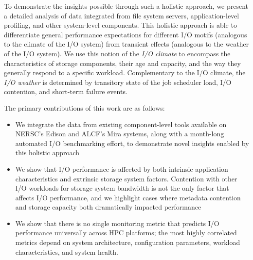 To demonstrate the insights possible through such a holistic approach, we present a detailed analysis of data integrated from file system servers, application-level profiling, and other system-level components.
This holistic approach is able to differentiate general performance expectations for different I/O motifs (analogous to the climate of the I/O system) from transient effects (analogous to the weather of the I/O system).
We use this notion of the \emph{I/O climate} to encompass the characteristics of storage components, their age and capacity, and the way they generally respond to a specific workload.
Complementary to the I/O climate, the \emph{I/O weather} is determined by transitory state of the job scheduler load, I/O contention, and short-term failure events.


The primary contributions of this work are as follows:
\begin{itemize}[leftmargin=*]
\item We integrate the data from existing component-level tools available on NERSC's Edison and ALCF's Mira systems, along with a month-long automated I/O benchmarking effort, to demonstrate novel insights enabled by this holistic approach
\item We show that I/O performance is affected by both intrinsic application characteristics and extrinsic storage system factors.
Contention with other I/O workloads for storage system bandwidth is not the only factor that affects I/O performance, and
we highlight cases where metadata contention and storage capacity both dramatically impacted performance
\item We show that there is no single monitoring metric that predicts I/O performance
universally across HPC platforms; the most highly correlated metrics depend on system architecture, configuration parameters, workload characteristics, and system health.
\end{itemize}
